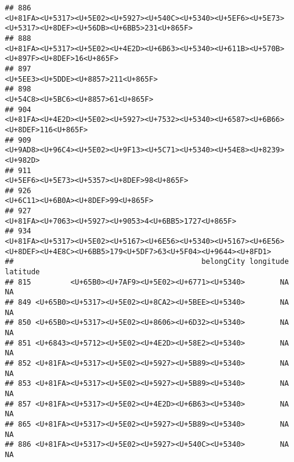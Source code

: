 \documentclass[
]{article}
\begin{document}
\begin{verbatim}
## 886                                                                              <U+81FA><U+5317><U+5E02><U+5927><U+540C><U+5340><U+5EF6><U+5E73><U+5317><U+8DEF><U+56DB><U+6BB5>231<U+865F>
## 888                                                                                               <U+81FA><U+5317><U+5E02><U+4E2D><U+6B63><U+5340><U+611B><U+570B><U+897F><U+8DEF>16<U+865F>
## 897                                                                                                                                                      <U+5EE3><U+5DDE><U+8857>211<U+865F>
## 898                                                                                                                                                       <U+54C8><U+5BC6><U+8857>61<U+865F>
## 904                                                                                                      <U+81FA><U+4E2D><U+5E02><U+5927><U+7532><U+5340><U+6587><U+6B66><U+8DEF>116<U+865F>
## 909                                                                                                                 <U+9AD8><U+96C4><U+5E02><U+9F13><U+5C71><U+5340><U+54E8><U+8239><U+982D>
## 911                                                                                                                                               <U+5EF6><U+5E73><U+5357><U+8DEF>98<U+865F>
## 926                                                                                                                                                       <U+6C11><U+6B0A><U+8DEF>99<U+865F>
## 927                                                                                                                                    <U+81FA><U+7063><U+5927><U+9053>4<U+6BB5>1727<U+865F>
## 934                                                            <U+81FA><U+5317><U+5E02><U+5167><U+6E56><U+5340><U+5167><U+6E56><U+8DEF><U+4E8C><U+6BB5>179<U+5DF7>63<U+5F04><U+9644><U+8FD1>
##                                           belongCity longitude latitude
## 815         <U+65B0><U+7AF9><U+5E02><U+6771><U+5340>        NA       NA
## 849 <U+65B0><U+5317><U+5E02><U+8CA2><U+5BEE><U+5340>        NA       NA
## 850 <U+65B0><U+5317><U+5E02><U+8606><U+6D32><U+5340>        NA       NA
## 851 <U+6843><U+5712><U+5E02><U+4E2D><U+58E2><U+5340>        NA       NA
## 852 <U+81FA><U+5317><U+5E02><U+5927><U+5B89><U+5340>        NA       NA
## 853 <U+81FA><U+5317><U+5E02><U+5927><U+5B89><U+5340>        NA       NA
## 857 <U+81FA><U+5317><U+5E02><U+4E2D><U+6B63><U+5340>        NA       NA
## 865 <U+81FA><U+5317><U+5E02><U+5927><U+5B89><U+5340>        NA       NA
## 886 <U+81FA><U+5317><U+5E02><U+5927><U+540C><U+5340>        NA       NA

\end{verbatim}
\end{document}

